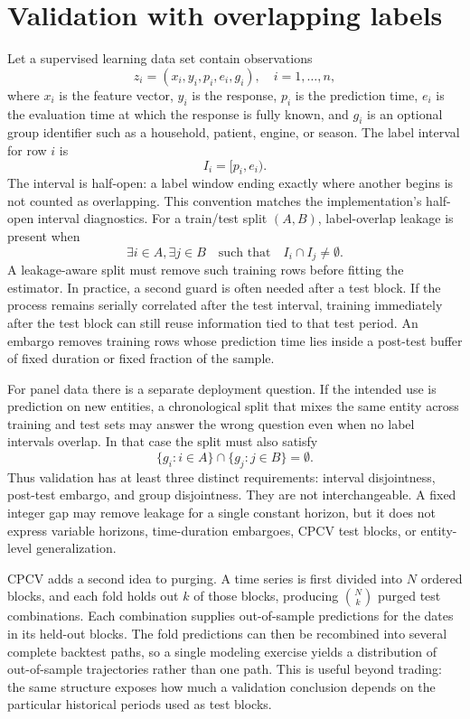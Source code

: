 \documentclass[11pt]{article}
\begin{document}
\section{Validation with overlapping labels}

Let a supervised learning data set contain observations
\[
  z_i = (x_i, y_i, p_i, e_i, g_i), \quad i = 1,\ldots,n,
\]
where $x_i$ is the feature vector, $y_i$ is the response, $p_i$ is the
prediction time, $e_i$ is the evaluation time at which the response is fully
known, and $g_i$ is an optional group identifier such as a household, patient,
engine, or season. The label interval for row $i$ is
\[
  I_i = [p_i, e_i).
\]
The interval is half-open: a label window ending exactly where another begins
is not counted as overlapping. This convention matches the implementation's
half-open interval diagnostics.
For a train/test split $(A, B)$, label-overlap leakage is present when
\[
  \exists i \in A, \exists j \in B
  \quad \text{such that} \quad I_i \cap I_j \ne \emptyset .
\]
A leakage-aware split must remove such training rows before fitting the
estimator. In practice, a second guard is often needed after a test block. If the
process remains serially correlated after the test interval, training
immediately after the test block can still reuse information tied to that test
period. An embargo removes training rows whose prediction time lies inside a
post-test buffer of fixed duration or fixed fraction of the sample.

For panel data there is a separate deployment question. If the intended use is
prediction on new entities, a chronological split that mixes the same entity
across training and test sets may answer the wrong question even when no label
intervals overlap. In that case the split must also satisfy
\[
  \{g_i: i \in A\} \cap \{g_j: j \in B\} = \emptyset .
\]
Thus validation has at least three distinct requirements: interval disjointness,
post-test embargo, and group disjointness. They are not interchangeable. A fixed
integer gap may remove leakage for a single constant horizon, but it does not
express variable horizons, time-duration embargoes, CPCV test blocks, or
entity-level generalization.

CPCV adds a second idea to purging. A time series is first divided into $N$
ordered blocks, and each fold holds out $k$ of those blocks, producing
$\binom{N}{k}$ purged test combinations. Each combination supplies
out-of-sample predictions for the dates in its held-out blocks. The fold
predictions can then be recombined into several complete backtest paths, so a
single modeling exercise yields a distribution of out-of-sample trajectories
rather than one path. This is useful beyond trading: the same structure exposes
how much a validation conclusion depends on the particular historical periods
used as test blocks.
\end{document}
